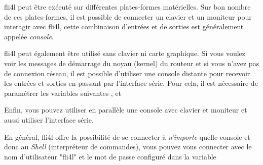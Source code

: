 

fli4l peut être exécuté sur différentes plates-formes matérielles. Sur bon
nombre de ces plates-formes, il est possible de connecter un clavier et un
moniteur pour interagir avec fli4l, cette combinaison d'entrées et de sorties
est généralement appelée \emph{console}.

fli4l peut également être utilisé sans clavier ni carte graphique. Si vous voulez
voir les messages de démarrage du noyau (kernel) du routeur et si vous n'avez pas
de connexion réseau, il est possible d'utiliser une console distante pour recevoir
les entrées et sorties en passant par l'interface série. Pour cela, il est nécessaire
de paramétrer les variables suivantes
,
 et

Enfin, vous pouvez utiliser en parallèle une console avec clavier et moniteur
et aussi utiliser l’interface série.

En général, fli4l offre la possibilité de se connecter à \emph{n’importe} quelle
console et donc au \emph{Shell} (interpréteur de commandes), vous pouvez vous
connecter avec le nom d'utilisateur "fli4l" et le mot de passe configuré dans
la variable 

